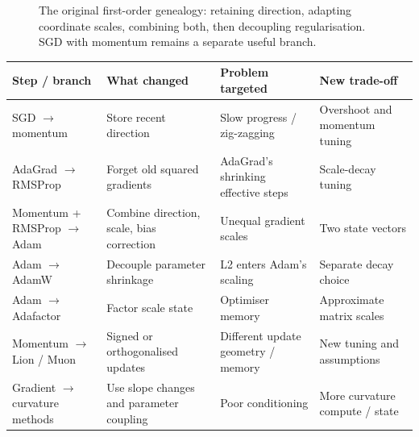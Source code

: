 \begin{figure}[htbp]
\centering
{}
\caption{The original first-order genealogy: retaining direction, adapting coordinate scales, combining both, then decoupling regularisation. SGD with momentum remains a separate useful branch.}
\end{figure}

\begin{center}
\small
\begin{tabularx}{.97\linewidth}{@{}L{.18\linewidth}L{.26\linewidth}YY@{}}
\toprule
\textbf{Step / branch} & \textbf{What changed} & \textbf{Problem targeted} & \textbf{New trade-off} \\
\midrule
SGD $\to$ momentum & Store recent direction & Slow progress / zig-zagging & Overshoot and momentum tuning \\
AdaGrad $\to$ RMSProp & Forget old squared gradients & AdaGrad's shrinking effective steps & Scale-decay tuning \\
Momentum + RMSProp $\to$ Adam & Combine direction, scale, bias correction & Unequal gradient scales & Two state vectors \\
Adam $\to$ AdamW & Decouple parameter shrinkage & L2 enters Adam's scaling & Separate decay choice \\
Adam $\to$ Adafactor & Factor scale state & Optimiser memory & Approximate matrix scales \\
Momentum $\to$ Lion / Muon & Signed or orthogonalised updates & Different update geometry / memory & New tuning and assumptions \\
Gradient $\to$ curvature methods & Use slope changes and parameter coupling & Poor conditioning & More curvature compute / state \\
\bottomrule
\end{tabularx}
\end{center}

